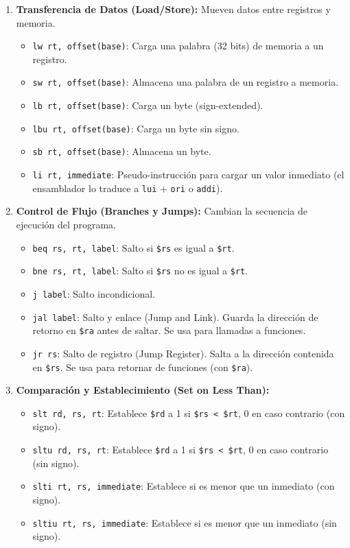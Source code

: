 \documentclass[letterpaper]{article}
\begin{document}
\begin{enumerate}
		\item \textbf{Transferencia de Datos (Load/Store):} Mueven datos entre registros y memoria.
		\begin{itemize}
			\item \texttt{lw rt, offset(base)}: Carga una palabra (32 bits) de memoria a un registro.
			\item \texttt{sw rt, offset(base)}: Almacena una palabra de un registro a memoria.
			\item \texttt{lb rt, offset(base)}: Carga un byte (sign-extended).
			\item \texttt{lbu rt, offset(base)}: Carga un byte sin signo.
			\item \texttt{sb rt, offset(base)}: Almacena un byte.
			\item \texttt{li rt, immediate}: Pseudo-instrucción para cargar un valor inmediato (el ensamblador lo traduce a \texttt{lui} + \texttt{ori} o \texttt{addi}).
		\end{itemize}
		
		\item \textbf{Control de Flujo (Branches y Jumps):} Cambian la secuencia de ejecución del programa.
		\begin{itemize}
			\item \texttt{beq rs, rt, label}: Salto si \texttt{\$rs} es igual a \texttt{\$rt}.
			\item \texttt{bne rs, rt, label}: Salto si \texttt{\$rs} no es igual a \texttt{\$rt}.
			\item \texttt{j label}: Salto incondicional.
			\item \texttt{jal label}: Salto y enlace (Jump and Link). Guarda la dirección de retorno en \texttt{\$ra} antes de saltar. Se usa para llamadas a funciones.
			\item \texttt{jr rs}: Salto de registro (Jump Register). Salta a la dirección contenida en \texttt{\$rs}. Se usa para retornar de funciones (con \texttt{\$ra}).
		\end{itemize}
		
		\item \textbf{Comparación y Establecimiento (Set on Less Than):}
		\begin{itemize}
			\item \texttt{slt rd, rs, rt}: Establece \texttt{\$rd} a 1 si \texttt{\$rs < \$rt}, 0 en caso contrario (con signo).
			\item \texttt{sltu rd, rs, rt}: Establece \texttt{\$rd} a 1 si \texttt{\$rs < \$rt}, 0 en caso contrario (sin signo).
			\item \texttt{slti rt, rs, immediate}: Establece si es menor que un inmediato (con signo).
			\item \texttt{sltiu rt, rs, immediate}: Establece si es menor que un inmediato (sin signo).
		\end{itemize}
	\end{enumerate}
	
\end{document}

